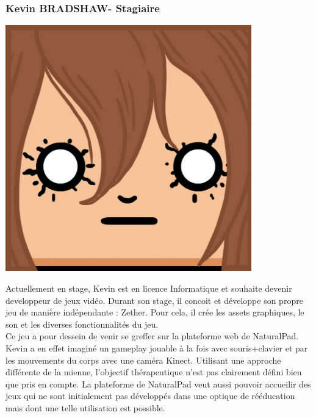		\subsubsection*{Kevin BRADSHAW- Stagiaire}
\begin{minipage}[t!]{0.2\linewidth}
\centering
\includegraphics[width=0.8\textwidth]{images/tetocarre/kevin}
\end{minipage}
\begin{minipage}[t!]{0.79\linewidth}
Actuellement en stage, Kevin est en licence Informatique et souhaite devenir developpeur de jeux vidéo. Durant son stage, il concoit et développe son propre jeu de manière indépendante : Zether. Pour cela, il crée les assets graphiques, le son et les diverses fonctionnalités du jeu. \\
Ce jeu a pour dessein de venir se greffer sur la plateforme web de NaturalPad. Kevin a en effet imaginé un gameplay jouable à la fois avec souris+clavier et par les mouvements du corps avec une caméra Kinect. Utilisant une approche différente de la mienne, l'objectif thérapeutique n'est pas clairement défini bien que pris en compte. La plateforme de NaturalPad veut aussi pouvoir accueilir des jeux qui ne sont initialement pas développés dans une optique de rééducation mais dont une telle utilisation est possible.
\end{minipage}
		
